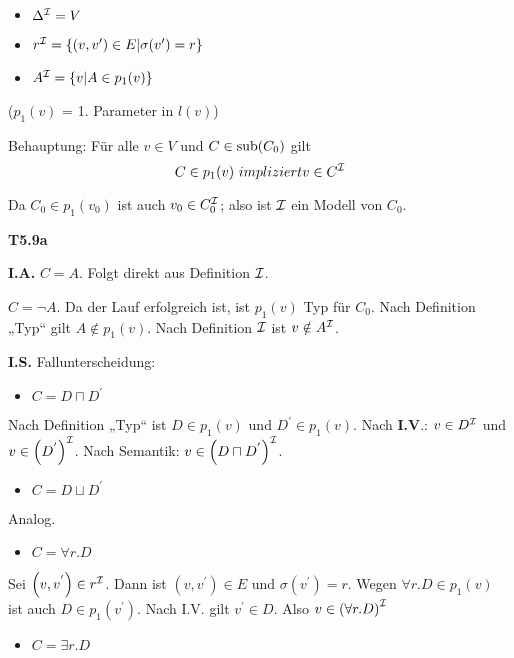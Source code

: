 \begin{itemize}
  \item $\Delta^{\mathcal{I}} = V$
  \item $r^{\mathcal{I}} = \{(v,v')\in E | \sigma (v') = r\}$
  \item $A^{\mathcal{I}} = \{v | A \in p_1(v)\}$
\end{itemize}

($p_1(v)$ = 1. Parameter in $l(v)$)

Behauptung: Für alle $v \in V$ und $C \in \operatorname{sub}(C_0)$ gilt $$C \in p_1(v)\ impliziert v \in C^{\mathcal{I}}$$

Da $C_0 \in p_1(v_0)$ ist auch $v_0 \in C_0^{\mathcal{I}}$; also ist $\mathcal{I}$ ein Modell von $C_0$.

\textbf{T5.9a}

\textbf{I.A.} $C = A$. Folgt direkt aus Definition $\mathcal{I}$.

$C = \neg A$. Da der Lauf erfolgreich ist, ist
$p_1\left( v \right)$ Typ für $C_{0}$. Nach Definition „Typ`` gilt
$A \notin p_1\left( v \right)$. Nach Definition $\mathcal{I}$ ist
$v \notin A^{\mathcal{I}}$.

\textbf{I.S.} Fallunterscheidung:

\begin{itemize}
\item
  $C = D \sqcap D^{'}$
\end{itemize}

Nach Definition „Typ`` ist $D \in p_1\left( v \right)$ und
$D^{'} \in p_1\left( v \right)$. Nach \textbf{I.V}.: $v \in D^{\mathcal{I}}$
und $v \in \left( D^{'} \right)^\MI$. Nach Semantik:
$v \in \left( D \sqcap D^{'} \right)^\MI$.

\begin{itemize}
\item
  $C = D \sqcup D^{'}$
\end{itemize}

Analog.

\begin{itemize}
\item
  $C = \forall r.D$
\end{itemize}

Sei $\left( v,v^{'} \right) \in r^\MI$. Dann ist
$\left( v,v^{'} \right) \in E$ und $\sigma\left( v^{'} \right) = r$.
Wegen $\forall r.D \in p_1(v)$ ist auch
$D \in p_1\left( v^{'} \right)$. Nach I.V. gilt $v^{'} \in D$.
Also $v \in \left( \forall r.D \right)^\MI$

\begin{itemize}
\item
  $C = \exists r.D$
\end{itemize}

